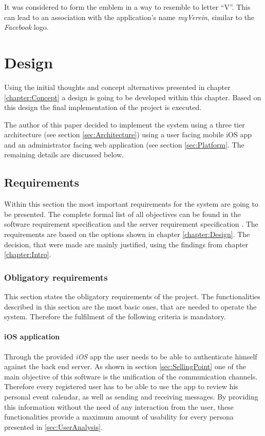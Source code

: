 It was considered to form the emblem in a way to resemble to letter \enquote{V}. This can lead to an association with the application's name \emph{myVerein}, similar to the \emph{Facebook} logo. 

\chapter{Design}
\label{chapter:Design}

Using the initial thoughts and concept alternatives presented in chapter \vref{chapter:Concept} a design is going to be developed within this chapter. Based on this design the final implementation of the project is executed.

The author of this paper decided to implement the system using a three tier architecture (see section \vref{sec:Architecture}) using a user facing mobile iOS app and an administrator facing web application (see section \vref{sec:Platform}. The remaining details are discussed below.

\section{Requirements}
\label{sec:Requirements}
Within this section the most important requirements for the system are going to be presented. The complete formal list of all objectives can be found in the software requirement specification \cite{Steiler:2014aa} and the server requirement specification \cite{Steiler:2014ab}. The requirements are based on the options shown in chapter \vref{chapter:Design}. The decision, that were made are mainly justified, using the findings from chapter \vref{chapter:Intro}.

\subsection{Obligatory requirements} %
\label{sec:ObligatoryReq}

This section states the obligatory requirements of the project. The functionalities described in this section are the most basic ones, that are needed to operate the system. Therefore the fulfilment of the following criteria is mandatory.

\subsubsection{iOS application}

Through the provided \emph{iOS} app the user needs to be able to authenticate himself against the back end server. As shown in section \vref{sec:SellingPoint} one of the main objective of this software is the unification of the communication channels. Therefore every registered user has to be able to use the app to review his personal event calendar, as well as sending and receiving messages. By providing this information without the need of any interaction from the user, these functionalities provide a maximum amount of usability for every persona presented in \vref{sec:UserAnalysis}. 

